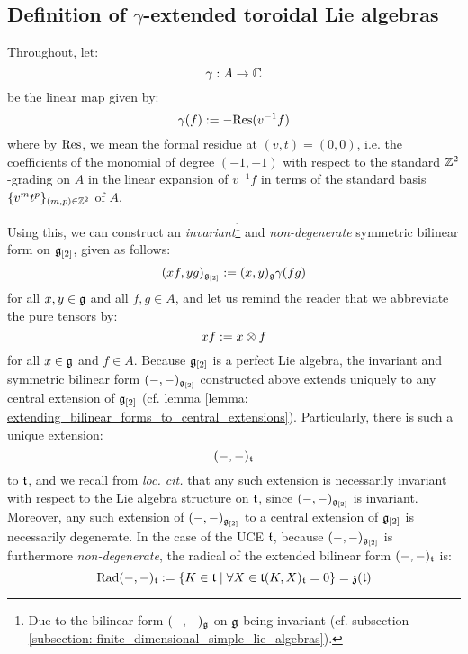     \subsection{Definition of \texorpdfstring{$\gamma$}{}-extended toroidal Lie algebras}
        \begin{convention}
            Throughout, let:
                $$\gamma: A \to \mathbb{C}$$
            be the linear map given by:
                $$\gamma(f) := -\mathrm{Res}(v^{-1} f)$$
            where by $\mathrm{Res}$, we mean the formal residue at $(v, t) = (0, 0)$, i.e. the coefficients of the monomial of degree $(-1, -1)$ with respect to the standard $\mathbb{Z}^2$-grading on $A$ in the linear expansion of $v^{-1} f$ in terms of the standard basis $\{v^m t^p\}_{(m, p) \in \mathbb{Z}^2}$ of $A$. 
        \end{convention}
        
        Using this, we can construct an \textit{invariant}\footnote{Due to the bilinear form $(-, -)_{\mathfrak{g}}$ on $\mathfrak{g}$ being invariant (cf. subsection \ref{subsection: finite_dimensional_simple_lie_algebras}).} and \textit{non-degenerate} symmetric bilinear form on $\mathfrak{g}_{[2]}$, given as follows:
            $$(xf, yg)_{\mathfrak{g}_{[2]}} := (x, y)_{\mathfrak{g}} \gamma(fg)$$
        for all $x, y \in \mathfrak{g}$ and all $f, g \in A$, and let us remind the reader that we abbreviate the pure tensors by:
            $$xf := x \tensor f$$
        for all $x \in \mathfrak{g}$ and $f \in A$. Because $\mathfrak{g}_{[2]}$ is a perfect Lie algebra, the invariant and symmetric bilinear form $(-, -)_{\mathfrak{g}_{[2]}}$ constructed above extends uniquely to any central extension of $\mathfrak{g}_{[2]}$ (cf. lemma \ref{lemma: extending_bilinear_forms_to_central_extensions}). Particularly, there is such a unique extension:
            $$(-, -)_{\mathfrak{t}}$$
        to $\mathfrak{t}$, and we recall from \textit{loc. cit.} that any such extension is necessarily invariant with respect to the Lie algebra structure on $\mathfrak{t}$, since $(-, -)_{\mathfrak{g}_{[2]}}$ is invariant. Moreover, any such extension of $(-, -)_{\mathfrak{g}_{[2]}}$ to a central extension of $\mathfrak{g}_{[2]}$ is necessarily degenerate. In the case of the UCE $\mathfrak{t}$, because $(-, -)_{\mathfrak{g}_{[2]}}$ is furthermore \textit{non-degenerate}, the radical of the extended bilinear form $(-, -)_{\mathfrak{t}}$ is:
            $$\operatorname{Rad}(-, -)_{\mathfrak{t}} := \{ K \in \mathfrak{t} \mid \forall X \in \mathfrak{t} (K, X)_{\mathfrak{t}} = 0 \} = \mathfrak{z}(\mathfrak{t})$$
            
